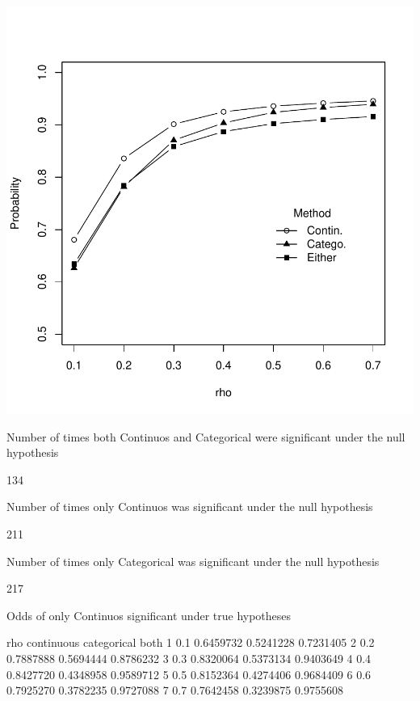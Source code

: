 \documentclass{article}
\begin{document}
\includegraphics{probabilities-t2}



\begin{Schunk}
\begin{Soutput}
Number of times both Continuos and Categorical were significant under the null hypothesis
\end{Soutput}
\begin{Soutput}
[1] 134
\end{Soutput}
\begin{Soutput}
Number of times only Continuos was significant under the null hypothesis
\end{Soutput}
\begin{Soutput}
[1] 211
\end{Soutput}
\begin{Soutput}
Number of times only Categorical was significant under the null hypothesis
\end{Soutput}
\begin{Soutput}
[1] 217
\end{Soutput}
\begin{Soutput}
Odds of only Continuos  significant under true hypotheses
\end{Soutput}
\begin{Soutput}
  rho continuous categorical      both
1 0.1  0.6459732   0.5241228 0.7231405
2 0.2  0.7887888   0.5694444 0.8786232
3 0.3  0.8320064   0.5373134 0.9403649
4 0.4  0.8427720   0.4348958 0.9589712
5 0.5  0.8152364   0.4274406 0.9684409
6 0.6  0.7925270   0.3782235 0.9727088
7 0.7  0.7642458   0.3239875 0.9755608
\end{Soutput}
\end{Schunk}
\end{document}
